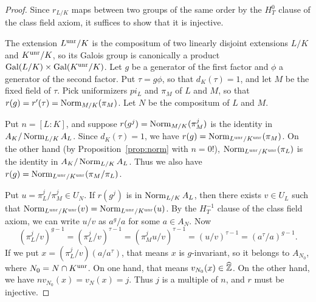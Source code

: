 \begin{proof}
Since $r_{L/K}$ maps between two groups of the same order by the
$H^0_T$ clause of the class field axiom, it suffices
to show that it is injective.

The extension $L^{\operatorname{unr}}/K$ is the compositum of two linearly disjoint
extensions $L/K$ and $K^{\operatorname{unr}}/K$, so its Galois group is canonically a
product $\operatorname{Gal}(L/K) \times \operatorname{Gal}(K^{\operatorname{unr}}/K)$. Let $g$ be a generator of
the first factor and $\phi$ a generator of the second factor. Put
$\tau = g\phi$, so that $d_K(\tau)=1$, and let $M$ be the fixed field
of $\tau$.
Pick uniformizers $pi_L$ and $\pi_M$ of $L$ and
$M$, so that
$r(g) = r'(\tau) = \operatorname{Norm}_{M/K}(\pi_M)$. Let $N$ be the compositum
of $L$ and $M$.

Put $n = [L:K]$, and suppose $r(g^j) = \operatorname{Norm}_{M/K}(\pi_M^j)$ is 
the identity in $A_K/\operatorname{Norm}_{L/K} A_L$.
Since $d_K(\tau) = 1$, we have
$r(g) = \operatorname{Norm}_{L^{\operatorname{unr}}/K^{\operatorname{unr}}}(\pi_M)$. On the other hand
(by Proposition~\ref{prop:norm} with $n=0$!),
$\operatorname{Norm}_{L^{\operatorname{unr}}/K^{\operatorname{unr}}}(\pi_L)$ is the identity in
$A_K/\operatorname{Norm}_{L/K} A_L$. Thus we also have
$r(g) = \operatorname{Norm}_{L^{\operatorname{unr}}/K^{\operatorname{unr}}}(\pi_M/\pi_L)$.

Put $u = \pi_L^j/\pi_M^j \in U_N$. If $r(g^j)$ is in $\operatorname{Norm}_{L/K} A_L$, 
then there exists $v \in U_L$ such that $\operatorname{Norm}_{L^{\operatorname{unr}}/K^{\operatorname{unr}}}(v)
= \operatorname{Norm}_{L^{\operatorname{unr}}/K^{\operatorname{unr}}}(u)$. By the $H^{-1}_T$ clause of the
class field axiom, we can write $u/v$ as $a^g/a$ for some
$a \in A_N$. Now
\[
(\pi_L^j/v)^{g-1} = (\pi_L^j/v)^{\tau-1} = (\pi_M^j u/v)^{\tau - 1}
= (u/v)^{\tau-1} = (a^\tau/a)^{g-1}.
\]
If we put $x = (\pi_L^j/v)(a/a^\tau)$, that means $x$ is $g$-invariant,
so it belongs to $A_{N_0}$, where $N_0 = N \cap K^{\operatorname{unr}}$. On one hand,
that means $v_{N_0}(x) \in \widehat{\mathbb{Z}}$. On the other hand,
we have $nv_{N_0}(x) = v_N(x) = j$. Thus $j$ is a multiple of $n$,
and $r$ must be injective.
\end{proof}

